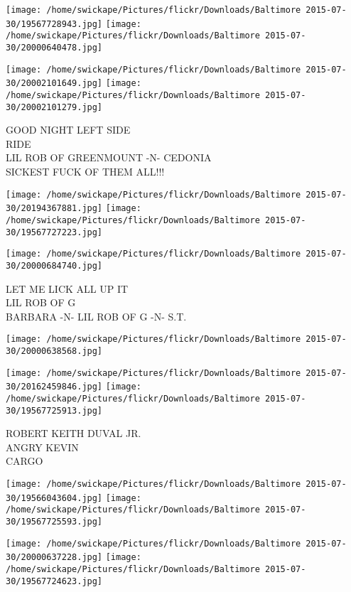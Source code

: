 \documentclass[10pt,letterpaper]{article}
\begin{document}
\texttt{[image: /home/swickape/Pictures/flickr/Downloads/Baltimore 2015-07-30/19567728943.jpg]}
\texttt{[image: /home/swickape/Pictures/flickr/Downloads/Baltimore 2015-07-30/20000640478.jpg]}

\texttt{[image: /home/swickape/Pictures/flickr/Downloads/Baltimore 2015-07-30/20002101649.jpg]}
\texttt{[image: /home/swickape/Pictures/flickr/Downloads/Baltimore 2015-07-30/20002101279.jpg]}

GOOD NIGHT LEFT SIDE\\
RIDE\\
LIL ROB OF GREENMOUNT {-}N{-} CEDONIA\\
SICKEST FUCK OF THEM ALL!!!\\
\pagebreak

\texttt{[image: /home/swickape/Pictures/flickr/Downloads/Baltimore 2015-07-30/20194367881.jpg]}
\texttt{[image: /home/swickape/Pictures/flickr/Downloads/Baltimore 2015-07-30/19567727223.jpg]}

\texttt{[image: /home/swickape/Pictures/flickr/Downloads/Baltimore 2015-07-30/20000684740.jpg]}

LET ME LICK ALL UP IT\\
LIL ROB OF G\\
BARBARA {-}N{-} LIL ROB OF G {-}N{-} S.T.\\
\pagebreak

\texttt{[image: /home/swickape/Pictures/flickr/Downloads/Baltimore 2015-07-30/20000638568.jpg]}

\vspace{0.25in}
\texttt{[image: /home/swickape/Pictures/flickr/Downloads/Baltimore 2015-07-30/20162459846.jpg]}
\texttt{[image: /home/swickape/Pictures/flickr/Downloads/Baltimore 2015-07-30/19567725913.jpg]}

ROBERT KEITH DUVAL JR.\\
ANGRY KEVIN\\
CARGO\\
\pagebreak

\texttt{[image: /home/swickape/Pictures/flickr/Downloads/Baltimore 2015-07-30/19566043604.jpg]}
\texttt{[image: /home/swickape/Pictures/flickr/Downloads/Baltimore 2015-07-30/19567725593.jpg]}

\texttt{[image: /home/swickape/Pictures/flickr/Downloads/Baltimore 2015-07-30/20000637228.jpg]}
\texttt{[image: /home/swickape/Pictures/flickr/Downloads/Baltimore 2015-07-30/19567724623.jpg]}
\end{document}

